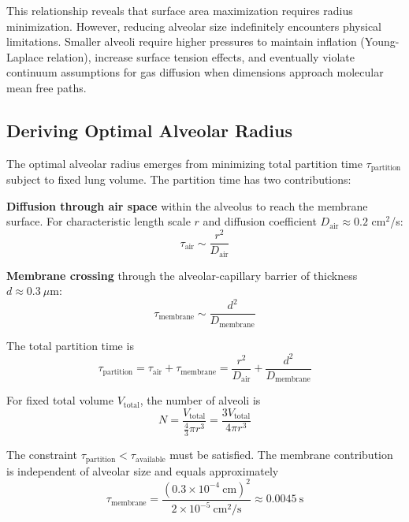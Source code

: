\documentclass[12pt,a4paper]{article}
\theoremstyle{remark}
\begin{document}
This relationship reveals that surface area maximization requires radius minimization. However, reducing alveolar size indefinitely encounters physical limitations. Smaller alveoli require higher pressures to maintain inflation (Young-Laplace relation), increase surface tension effects, and eventually violate continuum assumptions for gas diffusion when dimensions approach molecular mean free paths.

\subsection{Deriving Optimal Alveolar Radius}

The optimal alveolar radius emerges from minimizing total partition time $\tau_{\mathrm{partition}}$ subject to fixed lung volume. The partition time has two contributions:

\textbf{Diffusion through air space} within the alveolus to reach the membrane surface. For characteristic length scale $r$ and diffusion coefficient $D_{\mathrm{air}} \approx 0.2$ cm$^{2}$/s:
\begin{equation}
\tau_{\mathrm{air}} \sim \frac{r^{2}}{D_{\mathrm{air}}}
\end{equation}

\textbf{Membrane crossing} through the alveolar-capillary barrier of thickness $d \approx 0.3~\mu$m:
\begin{equation}
\tau_{\mathrm{membrane}} \sim \frac{d^{2}}{D_{\mathrm{membrane}}}
\end{equation}

The total partition time is
\begin{equation}
\tau_{\mathrm{partition}} = \tau_{\mathrm{air}} + \tau_{\mathrm{membrane}} = \frac{r^{2}}{D_{\mathrm{air}}} + \frac{d^{2}}{D_{\mathrm{membrane}}}
\end{equation}

For fixed total volume $V_{\mathrm{total}}$, the number of alveoli is
\begin{equation}
N = \frac{V_{\mathrm{total}}}{\frac{4}{3}\pi r^{3}} = \frac{3V_{\mathrm{total}}}{4\pi r^{3}}
\end{equation}

The constraint $\tau_{\mathrm{partition}} < \tau_{\mathrm{available}}$ must be satisfied. The membrane contribution is independent of alveolar size and equals approximately
\begin{equation}
\tau_{\mathrm{membrane}} = \frac{(0.3 \times 10^{-4}~\mathrm{cm})^{2}}{2 \times 10^{-5}~\mathrm{cm}^{2}/\mathrm{s}} \approx 0.0045~\mathrm{s}
\end{equation}
\end{document}
